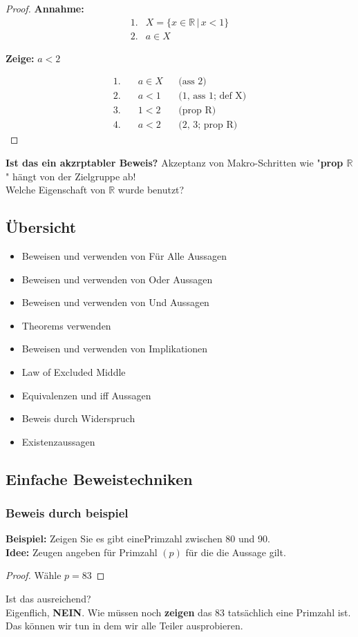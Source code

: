 \begin{proof}
    \textbf{Annahme:}
    \begin{align*}
    1. & X = \{x\in\mathbb{R} \,|\, x<1\} \\
    2. & a\in X
    \end{align*}

    \textbf{Zeige:} $a<2$

    \begin{align*}
    1. &\quad a\in X                   && \text{(ass 2)} \\
    2. &\quad a<1                      && \text{(1, ass 1; def X)} \\
    3. &\quad 1<2                      && \text{(prop R)} \\
    4. &\quad a<2                      && \text{(2, 3; prop R)}
    \end{align*}
\end{proof}
\textbf{Ist das ein akzrptabler Beweis?} Akzeptanz von Makro-Schritten wie "\textbf{prop $\mathbb{R}
$}" hängt von der Zielgruppe ab! \\ Welche Eigenschaft von $\mathbb{R}$ wurde benutzt?

\subsection{Übersicht}
\begin{itemize}
    \item Beweisen und verwenden von Für Alle Aussagen
    \item Beweisen und verwenden von Oder Aussagen
    \item Beweisen und verwenden von Und Aussagen 
    \item Theorems verwenden
    \item Beweisen und verwenden von Implikationen
    \item Law of Excluded Middle 
    \item Equivalenzen und iff Aussagen
    \item Beweis durch Widerspruch
    \item Existenzaussagen 
\end{itemize}

\subsection{Einfache Beweistechniken}
\subsubsection*{Beweis durch beispiel}
\textbf{Beispiel: } Zeigen Sie es gibt einePrimzahl zwischen 80 und 90.\\ \textbf{Idee: } Zeugen angeben für Primzahl $(p)$ für die die Aussage gilt.
\begin{proof}
    Wähle $p = 83$
\end{proof} 
Ist das ausreichend?\\Eigenflich, \textbf{NEIN}. Wie müssen noch \textbf{zeigen} das 83 tatsächlich eine Primzahl ist. \\Das können wir tun in dem wir alle Teiler ausprobieren. 

